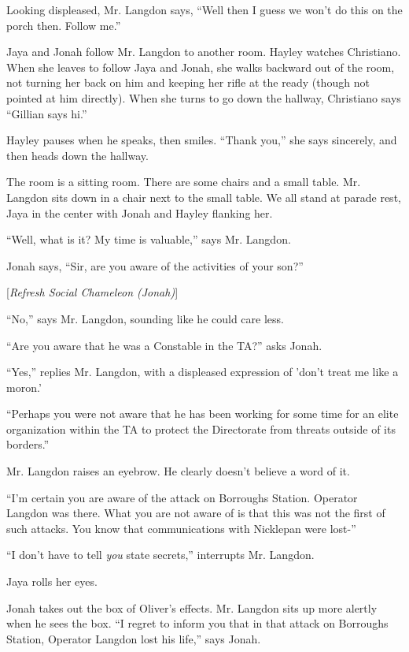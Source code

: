 Looking displeased, Mr. Langdon says, ``Well then I guess we won't do this on the porch then.  Follow me.''

Jaya and Jonah follow Mr. Langdon to another room.  Hayley watches Christiano.  When she leaves to follow Jaya and Jonah, she walks backward out of the room, not turning her back on him and keeping her rifle at the ready (though not pointed at him directly).  When she turns to go down the hallway, Christiano says ``Gillian says hi.''

Hayley pauses when he speaks, then smiles.  ``Thank you,'' she says sincerely, and then heads down the hallway.



The room is a sitting room.  There are some chairs and a small table.  Mr. Langdon sits down in a chair next to the small table.  We all stand at parade rest, Jaya in the center with Jonah and Hayley flanking her.

``Well, what is it?  My time is valuable,'' says Mr. Langdon.

Jonah says,  ``Sir, are you aware of the activities of your son?''

{[}\textit{Refresh Social Chameleon (Jonah)}{]}

``No,'' says Mr. Langdon, sounding like he could care less.

``Are you aware that he was a Constable in the TA?'' asks Jonah.

``Yes,'' replies Mr. Langdon, with a displeased expression of 'don't treat me like a moron.'

``Perhaps you were not aware that he has been working for some time for an elite organization within the TA to protect the Directorate from threats outside of its borders.''

Mr. Langdon raises an eyebrow.  He clearly doesn't believe a word of it.

``I'm certain you are aware of the attack on Borroughs Station.  Operator Langdon was there.  What you are not aware of is that this was not the first of such attacks.  You know that communications with Nicklepan were lost-''

``I don't have to tell \textit{you }state secrets,'' interrupts Mr. Langdon.

Jaya rolls her eyes.

Jonah takes out the box of Oliver's effects.  Mr. Langdon sits up more alertly when he sees the box.  ``I regret to inform you that in that attack on Borroughs Station, Operator Langdon lost his life,'' says Jonah.

